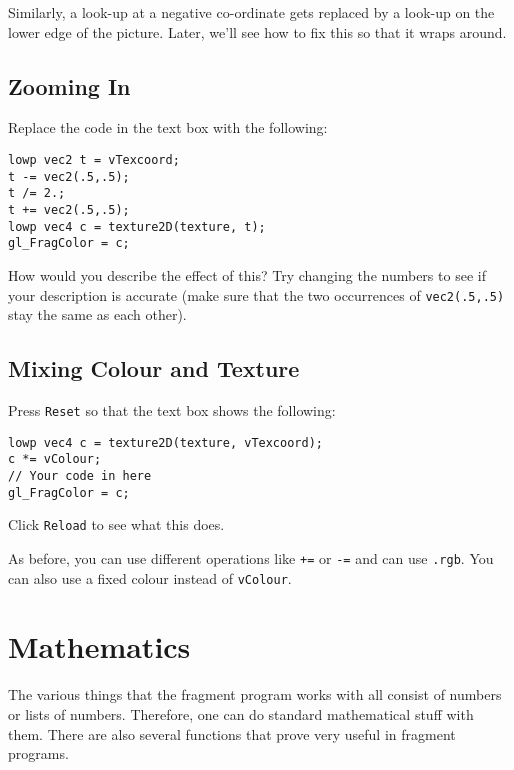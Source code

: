 \documentclass[
  html5,%
  mathml,%
  use filename%
]{internet}
\makeatletter
\let\prev@sec=\section
\renewcommand\section{\clearpage\prev@sec}
\makeatother
\begin{document}
Similarly, a look-up at a negative co-ordinate gets replaced by a look-up on the lower edge of the picture.
Later, we'll see how to fix this so that it wraps around.

\subsection{Zooming In}

Replace the code in the text box with the following:

\begin{tcolorbox}
\begin{verbatim}
lowp vec2 t = vTexcoord;
t -= vec2(.5,.5);
t /= 2.;
t += vec2(.5,.5);
lowp vec4 c = texture2D(texture, t);
gl_FragColor = c;
\end{verbatim}
\end{tcolorbox}

How would you describe the effect of this?
Try changing the numbers to see if your description is accurate (make sure that the two occurrences of \verb+vec2(.5,.5)+ stay the same as each other).

\subsection{Mixing Colour and Texture}

Press \verb+Reset+ so that the text box shows the following:

\begin{tcolorbox}
\begin{verbatim}
lowp vec4 c = texture2D(texture, vTexcoord);
c *= vColour;
// Your code in here
gl_FragColor = c;
\end{verbatim}
\end{tcolorbox}

Click \verb+Reload+ to see what this does.

As before, you can use different operations like \verb!+=! or \verb!-=! and can use \verb!.rgb!.
You can also use a fixed colour instead of \verb!vColour!.


\section{Mathematics}
\label{sec:maths}

The various things that the fragment program works with all consist of numbers or lists of numbers.
Therefore, one can do standard mathematical stuff with them.
There are also several functions that prove very useful in fragment programs.
\end{document}
